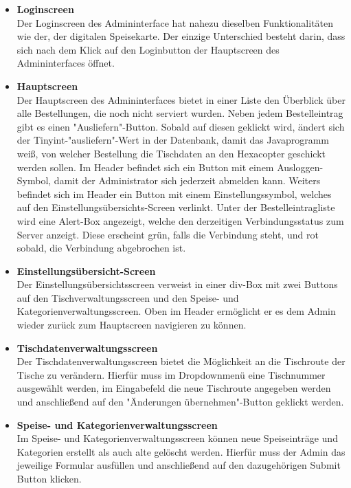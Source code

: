 \begin{itemize}
    \item \textbf{Loginscreen}\\
Der Loginscreen des Admininterface hat nahezu dieselben Funktionalitäten wie der, der digitalen Speisekarte. Der einzige Unterschied besteht darin, dass sich nach dem Klick auf den Loginbutton der Hauptscreen des Admininterfaces öffnet.
    \item \textbf{Hauptscreen}\\
Der Hauptscreen des Admininterfaces bietet in einer Liste den Überblick über alle Bestellungen, die noch nicht serviert wurden.
Neben jedem Bestelleintrag gibt es einen "Ausliefern"-Button. Sobald auf diesen geklickt wird, ändert sich der Tinyint-"ausliefern"-Wert in der Datenbank, damit das Javaprogramm weiß, von welcher Bestellung die Tischdaten an den Hexacopter geschickt werden sollen.
Im Header befindet sich ein Button mit einem Ausloggen-Symbol, damit der Administrator sich jederzeit abmelden kann. Weiters befindet sich im Header ein Button mit einem Einstellungssymbol, welches auf den Einstellungsübersichts-Screen verlinkt.
Unter der Bestelleintragliste wird eine Alert-Box angezeigt, welche den derzeitigen Verbindungsstatus zum Server anzeigt. Diese erscheint grün, falls die Verbindung steht, und rot sobald, die Verbindung abgebrochen ist.

    \item \textbf{Einstellungsübersicht-Screen}\\
Der Einstellungsübersichtsscreen verweist in einer div-Box mit zwei Buttons auf den Tischverwaltungsscreen und den Speise- und Kategorienverwaltungsscreen.
Oben im Header ermöglicht er es dem Admin wieder zurück zum Hauptscreen navigieren zu können.
    \item \textbf{Tischdatenverwaltungsscreen}\\
Der Tischdatenverwaltungsscreen bietet die Möglichkeit an die Tischroute der Tische zu verändern. Hierfür muss im Dropdownmenü eine Tischnummer ausgewählt werden, im Eingabefeld die neue Tischroute angegeben werden und anschließend auf den "Änderungen übernehmen"-Button geklickt werden.
    \item \textbf{Speise- und Kategorienverwaltungsscreen}\\
Im Speise- und Kategorienverwaltungsscreen können neue Speiseinträge und Kategorien erstellt als auch alte gelöscht werden.
Hierfür muss der Admin das jeweilige Formular ausfüllen und anschließend auf den dazugehörigen Submit Button klicken.
  \end{itemize}
